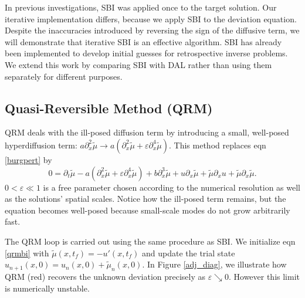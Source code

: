 \documentclass[%
 reprint,
 amsmath,amssymb,
 aps,
 pre,
]{revtex4-2}
\newcommand\tmu{\tilde{\mu}}
\begin{document}
In previous investigations, SBI was applied once to the target solution.
Our iterative implementation differs, because we apply SBI to the deviation equation.
Despite the inaccuracies introduced by reversing the sign of the diffusive term, we will demonstrate that iterative SBI is an effective algorithm.
SBI has already been implemented to develop initial guesses for retrospective inverse problems. 
We extend this work by comparing SBI with DAL rather than using them separately for different purposes.

\subsection{Quasi-Reversible Method (QRM)}\label{secQRM}
QRM deals with the ill-posed diffusion term by introducing a small, well-posed hyperdiffusion term: $a\partial_x^2 \tmu \to a(\partial_x^2 \tmu + \varepsilon \partial_x^4 \tmu)$. 
This method replaces eqn \ref{burgpert} by
\begin{equation}
  0 = \partial_t \tmu - a(\partial_x^2 \tmu + \varepsilon\partial_x^4 \tmu) + b\partial_x^3 \tmu + u\partial_x\tmu + \tmu\partial_x u + \tmu\partial_x\tmu.\label{qrmbi}
\end{equation} 
$0 < \varepsilon \ll 1$ is a free parameter chosen according to the numerical resolution as well as the solutions' spatial scales.
Notice how the ill-posed term remains, but the equation becomes well-posed because small-scale modes do not grow arbitrarily fast.

The QRM loop is carried out using the same procedure as SBI.
We initialize eqn \ref{qrmbi} with $\tmu(x, t_f) = -u'(x,t_f)$ and update the trial state $u_{n+1}(x,0) = u_n(x,0) + \tmu_n(x,0)$.
In Figure \ref{adj_diag}, we illustrate how QRM (red) recovers the unknown deviation precisely as $\varepsilon\searrow 0$.
However this limit is numerically unstable.
\end{document}
